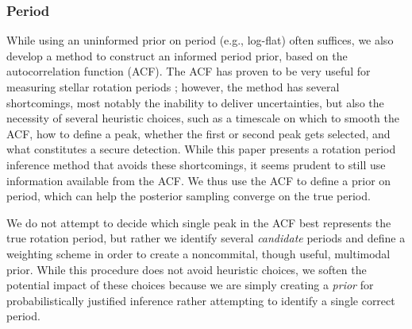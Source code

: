 \documentclass[useAMS, usenatbib, preprint, 12pt]{aastex}
\begin{document}

\subsubsection{Period}
\label{sec:period_prior}

While using an uninformed prior on period (e.g., log-flat) often suffices,
we also develop a method to construct an informed period prior, based on the
autocorrelation function (ACF).
The ACF has proven to be very useful for measuring stellar rotation periods
\citep{Mcquillan2012, Mcquillan13b, Mcquillan2014}; however, the
method has several shortcomings,
most notably the inability to deliver uncertainties, but also
the necessity of several heuristic choices,
such as a timescale on which to smooth the ACF,
how to define a peak, whether the first or second peak
gets selected, and what constitutes a secure detection.
While this paper presents a rotation period inference method
that avoids these shortcomings,
it seems prudent to still use information available from the ACF.
We thus use the ACF to define a prior on period,
which can help the posterior sampling converge on the true period.

We do not attempt to decide which single
peak in the ACF best represents the true rotation period,
but rather we identify several \emph{candidate} periods and define
a weighting scheme in order to create a noncommital, though useful,
multimodal prior.  While this procedure does not avoid heuristic choices,
we soften the potential impact of these choices because we are simply
creating a \emph{prior} for probabilistically justified
inference rather attempting to identify a single correct period.
\end{document}
